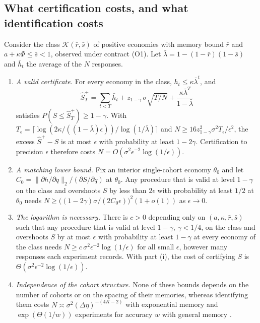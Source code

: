 \subsection{What certification costs, and what identification costs}

\begin{theorem}\label{thm:certcost}
Consider the class $\mathcal K(\bar r,\bar s)$ of positive economies with memory bound $\bar r$ and $a+\kappa\Phi\le\bar s<1$, observed under contract (O1). Let $\bar\lambda=1-(1-\bar r)(1-\bar s)$ and $\bar h_t$ the average of the $N$ responses.
\begin{enumerate}[label=(\roman*)]
\item \emph{A valid certificate.} For every economy in the class, $h_t\le\kappa\bar\lambda^t$, and
\[
\hat S^+_T=\sum_{t<T}\bar h_t+z_{1-\gamma}\,\sigma\sqrt{T/N}+\frac{\kappa\bar\lambda^T}{1-\bar\lambda}
\]
satisfies $P(S\le\hat S^+_T)\ge1-\gamma$. With $T_\epsilon=\lceil\log(2\kappa/((1-\bar\lambda)\epsilon))/\log(1/\bar\lambda)\rceil$ and $N\ge16z_{1-\gamma}^2\sigma^2T_\epsilon/\epsilon^2$, the excess $\hat S^+-S$ is at most $\epsilon$ with probability at least $1-2\gamma$. Certification to precision $\epsilon$ therefore costs $N=O(\sigma^2\epsilon^{-2}\log(1/\epsilon))$.
\item \emph{A matching lower bound.} Fix an interior single-cohort economy $\theta_0$ and let $C_0=\|\partial h/\partial q\|_2/(\partial S/\partial q)$ at $\theta_0$. Any procedure that is valid at level $1-\gamma$ on the class and overshoots $S$ by less than $2\epsilon$ with probability at least $1/2$ at $\theta_0$ needs $N\ge\bigl((1-2\gamma)\sigma/(2C_0\epsilon)\bigr)^2(1+o(1))$ as $\epsilon\to0$.
\item \emph{The logarithm is necessary.} There is $c>0$ depending only on $(a,\kappa,\bar r,\bar s)$ such that any procedure that is valid at level $1-\gamma$, $\gamma<1/4$, on the class and overshoots $S$ by at most $\epsilon$ with probability at least $1-\gamma$ at every economy of the class needs $N\ge c\,\sigma^2\epsilon^{-2}\log(1/\epsilon)$ for all small $\epsilon$, however many responses each experiment records. With part (i), the cost of certifying $S$ is $\Theta(\sigma^2\epsilon^{-2}\log(1/\epsilon))$.
\item \emph{Independence of the cohort structure.} None of these bounds depends on the number of cohorts or on the spacing of their memories, whereas identifying them costs $N\asymp\sigma^2(\Delta\eta)^{-(4K-2)}$ with exponential memory and $\exp(\Theta(1/w))$ experiments for accuracy $w$ with general memory \citep{niroula2026}.
\end{enumerate}
\end{theorem}

